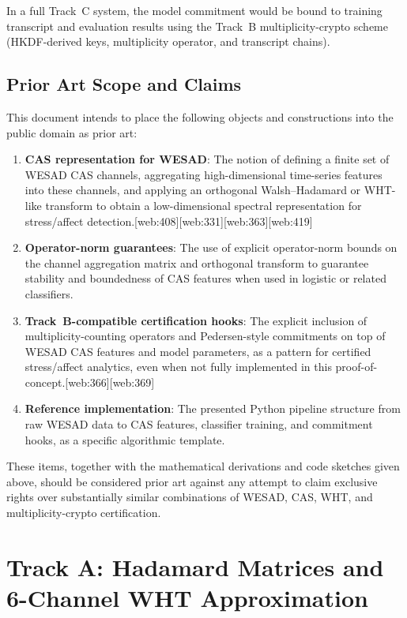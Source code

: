 \documentclass[11pt]{article}
\begin{document}
In a full Track~C system, the model commitment would be bound to training transcript and evaluation results using the Track~B multiplicity-crypto scheme (HKDF-derived keys, multiplicity operator, and transcript chains).

\subsection{Prior Art Scope and Claims}

This document intends to place the following objects and constructions into the public domain as prior art:

\begin{enumerate}
  \item \textbf{CAS representation for WESAD}: The notion of defining a finite set of WESAD CAS channels, aggregating high-dimensional time-series features into these channels, and applying an orthogonal Walsh--Hadamard or WHT-like transform to obtain a low-dimensional spectral representation for stress/affect detection.\cite{Schmidt2018_WESAD,WHTOverview,WHTOrthogonal}[web:408][web:331][web:363][web:419]
  \item \textbf{Operator-norm guarantees}: The use of explicit operator-norm bounds on the channel aggregation matrix and orthogonal transform to guarantee stability and boundedness of CAS features when used in logistic or related classifiers.
  \item \textbf{Track~B-compatible certification hooks}: The explicit inclusion of multiplicity-counting operators and Pedersen-style commitments on top of WESAD CAS features and model parameters, as a pattern for certified stress/affect analytics, even when not fully implemented in this proof-of-concept.\cite{Pedersen_ZKDocs,Pedersen_RareSkills}[web:366][web:369]
  \item \textbf{Reference implementation}: The presented Python pipeline structure from raw WESAD data to CAS features, classifier training, and commitment hooks, as a specific algorithmic template.
\end{enumerate}

These items, together with the mathematical derivations and code sketches given above, should be considered prior art against any attempt to claim exclusive rights over substantially similar combinations of WESAD, CAS, WHT, and multiplicity-crypto certification.

\appendix
\section{Track A: Hadamard Matrices and 6-Channel WHT Approximation}
\end{document}
